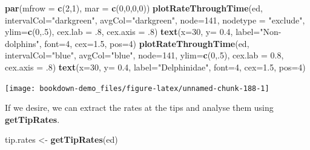 \documentclass[
]{book}
\newenvironment{Shaded}{\begin{snugshade}}{\end{snugshade}}
\newcommand{\DataTypeTok}[1]{\textcolor[rgb]{0.13,0.29,0.53}{#1}}
\newcommand{\DecValTok}[1]{\textcolor[rgb]{0.00,0.00,0.81}{#1}}
\newcommand{\FloatTok}[1]{\textcolor[rgb]{0.00,0.00,0.81}{#1}}
\newcommand{\KeywordTok}[1]{\textcolor[rgb]{0.13,0.29,0.53}{\textbf{#1}}}
\newcommand{\NormalTok}[1]{#1}
\newcommand{\StringTok}[1]{\textcolor[rgb]{0.31,0.60,0.02}{#1}}
\begin{document}
\begin{Shaded}
\begin{Highlighting}[]
\KeywordTok{par}\NormalTok{(}\DataTypeTok{mfrow =} \KeywordTok{c}\NormalTok{(}\DecValTok{2}\NormalTok{,}\DecValTok{1}\NormalTok{), }\DataTypeTok{mar =} \KeywordTok{c}\NormalTok{(}\DecValTok{0}\NormalTok{,}\DecValTok{0}\NormalTok{,}\DecValTok{0}\NormalTok{,}\DecValTok{0}\NormalTok{))}
\KeywordTok{plotRateThroughTime}\NormalTok{(ed, }\DataTypeTok{intervalCol=}\StringTok{"darkgreen"}\NormalTok{, }\DataTypeTok{avgCol=}\StringTok{"darkgreen"}\NormalTok{, }\DataTypeTok{node=}\DecValTok{141}\NormalTok{, }\DataTypeTok{nodetype =} \StringTok{"exclude"}\NormalTok{, }\DataTypeTok{ylim=}\KeywordTok{c}\NormalTok{(}\DecValTok{0}\NormalTok{,.}\DecValTok{5}\NormalTok{), }\DataTypeTok{cex.lab =} \FloatTok{.8}\NormalTok{, }\DataTypeTok{cex.axis =} \FloatTok{.8}\NormalTok{)}
\KeywordTok{text}\NormalTok{(}\DataTypeTok{x=}\DecValTok{30}\NormalTok{, }\DataTypeTok{y=} \FloatTok{0.4}\NormalTok{, }\DataTypeTok{label=}\StringTok{"Non{-}dolphins"}\NormalTok{, }\DataTypeTok{font=}\DecValTok{4}\NormalTok{, }\DataTypeTok{cex=}\FloatTok{1.5}\NormalTok{, }\DataTypeTok{pos=}\DecValTok{4}\NormalTok{)}
\KeywordTok{plotRateThroughTime}\NormalTok{(ed, }\DataTypeTok{intervalCol=}\StringTok{"blue"}\NormalTok{, }\DataTypeTok{avgCol=}\StringTok{"blue"}\NormalTok{, }\DataTypeTok{node=}\DecValTok{141}\NormalTok{, }\DataTypeTok{ylim=}\KeywordTok{c}\NormalTok{(}\DecValTok{0}\NormalTok{,.}\DecValTok{5}\NormalTok{), }\DataTypeTok{cex.lab =} \FloatTok{0.8}\NormalTok{, }\DataTypeTok{cex.axis =} \FloatTok{.8}\NormalTok{)}
\KeywordTok{text}\NormalTok{(}\DataTypeTok{x=}\DecValTok{30}\NormalTok{, }\DataTypeTok{y=} \FloatTok{0.4}\NormalTok{, }\DataTypeTok{label=}\StringTok{"Delphinidae"}\NormalTok{, }\DataTypeTok{font=}\DecValTok{4}\NormalTok{, }\DataTypeTok{cex=}\FloatTok{1.5}\NormalTok{, }\DataTypeTok{pos=}\DecValTok{4}\NormalTok{)}
\end{Highlighting}
\end{Shaded}

\begin{center}\texttt{[image: bookdown-demo\_files/figure-latex/unnamed-chunk-188-1]} \end{center}

If we desire, we can extract the rates at the tips and analyse them using \textbf{getTipRates}.

\begin{Shaded}
\begin{Highlighting}[]
\NormalTok{tip.rates \textless{}{-}}\StringTok{ }\KeywordTok{getTipRates}\NormalTok{(ed)}
\end{Highlighting}
\end{Shaded}
\end{document}

